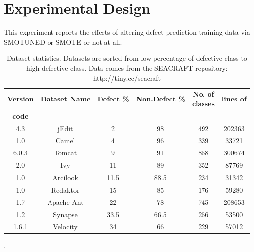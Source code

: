 \documentclass[10pt,conference]{IEEEtran}
\theoremstyle{break}
\theoremstyle{break}
\begin{document}
\section{Experimental Design}
\label{sect:experiment}
 
This experiment  reports the effects of altering defect prediction
training
data   via SMOTUNED or SMOTE or not at all. 
 
 \begin{table}[!t]
\begin{center}
\begin{tabular}{|c|c|c|c|c|c|}
\hline 
\textbf{Version} & \textbf{Dataset Name} &  \textbf{Defect \%} & \textbf{Non-Defect \%} & \textbf{No. of \\} \textbf{classes} & \textbf{lines of} \\ \textbf{code}\\[0.5ex]
\hline
4.3 & jEdit & 2 & 98 & 492 & 202363 \\
\hline
1.0 &   Camel & 4 & 96 & 339 & 33721 \\ 
\hline
6.0.3 &   Tomcat & 9 & 91 & 858 & 300674\\
\hline
2.0 &   Ivy & 11 & 89 & 352 & 87769 \\ 
\hline
1.0 & Arcilook & 11.5 & 88.5 & 234 & 31342\\
\hline
1.0 & Redaktor & 15 & 85 & 176 & 59280 \\
\hline
1.7 & Apache Ant & 22 & 78 & 745 & 208653 \\ 
\hline
1.2 &   Synapse & 33.5 & 66.5 & 256 & 53500 \\
\hline
1.6.1 &   Velocity & 34 & 66 & 229 & 57012 \\
\hline
\end{tabular}
\end{center}
\caption{Dataset statistics. Datasets are sorted from low percentage of defective class to high defective class.
Data comes from the SEACRAFT repository: http://tiny.cc/seacraft}.
\label{tb:dataset}
\vspace{-0.6cm}
\end{table}


\newcommand\fnote[1]{\captionsetup{font=small}\caption*{#1}}
\end{document}
